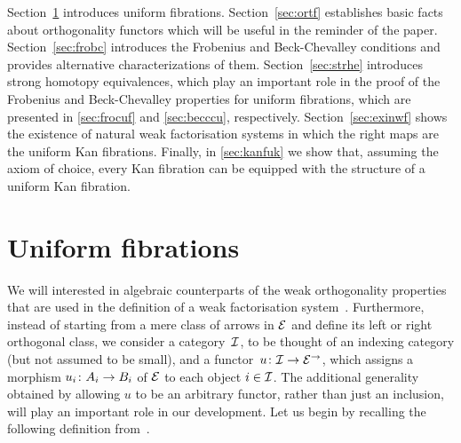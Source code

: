 \documentclass[reqno,10pt,a4paper,oneside,draft]{amsart}
\begin{document}

Section~\ref{sec:unif} introduces uniform fibrations.
Section~\ref{sec:ortf} establishes basic facts about orthogonality functors which will be useful in the reminder of the paper.
Section~\ref{sec:frobc} introduces the Frobenius and Beck-Chevalley conditions and provides alternative characterizations of them.
Section~\ref{sec:strhe} introduces strong homotopy equivalences, which play an important role in the proof of the Frobenius and Beck-Chevalley properties for uniform fibrations, which are presented in \cref{sec:frocuf} and \cref{sec:becccu}, respectively.
Section~\ref{sec:exinwf} shows the existence of natural weak factorisation systems in which the right maps are the uniform Kan fibrations.
Finally, in \cref{sec:kanfuk} we show that, assuming the axiom of choice, every Kan fibration can be equipped with the structure of a uniform Kan fibration. 


\section{Uniform fibrations}
\label{sec:unif}

We will interested in algebraic counterparts of the  weak orthogonality properties that are used in the definition of a weak factorisation system~\cite{bousfield-wfs}. Furthermore, instead of starting from a mere class of arrows in $\catE$ and define its left or right orthogonal class, we consider a category~$\cal{I}$, to be thought of an indexing category (but not assumed to be small), and a functor~$u \co \cal{I} \to \catE^\to$, which assigns a morphism $u_i \co A_i \to B_i$ of $\catE$ to each object $i \in \cal{I}$. The additional generality obtained by allowing $u$ to be an arbitrary functor, rather than just an inclusion, will play an important role in our development. Let us begin by recalling the following definition 
from~\cite{garner:small-object-argument}. 
\end{document}
